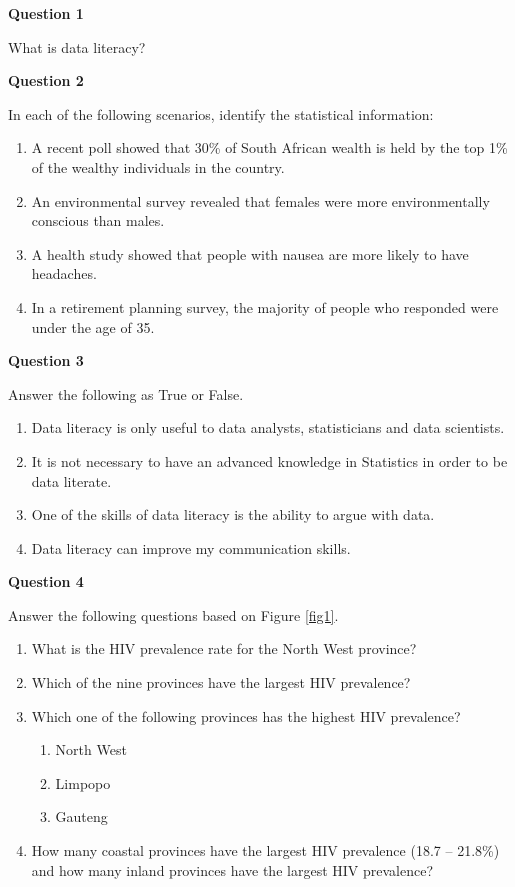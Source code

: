 \documentclass[
]{book}
\begin{document}
\textbf{Question 1}

What is data literacy?

\textbf{Question 2}

In each of the following scenarios, identify the statistical information:

\begin{enumerate}
\def\labelenumi{\alph{enumi}.}
\item
  A recent poll showed that 30\% of South African wealth is held by the top 1\% of the wealthy individuals in the country.
\item
  An environmental survey revealed that females were more environmentally conscious than males.
\item
  A health study showed that people with nausea are more likely to have headaches.
\item
  In a retirement planning survey, the majority of people who responded were under the age of 35.
\end{enumerate}

\textbf{Question 3}

Answer the following as True or False.

\begin{enumerate}
\def\labelenumi{\alph{enumi}.}
\item
  Data literacy is only useful to data analysts, statisticians and data scientists.
\item
  It is not necessary to have an advanced knowledge in Statistics in order to be data literate.
\item
  One of the skills of data literacy is the ability to argue with data.
\item
  Data literacy can improve my communication skills.
\end{enumerate}

\textbf{Question 4}

Answer the following questions based on Figure \ref{fig1}.

\begin{enumerate}
\def\labelenumi{\alph{enumi}.}
\item
  What is the HIV prevalence rate for the North West province?
\item
  Which of the nine provinces have the largest HIV prevalence?
\item
  Which one of the following provinces has the highest HIV prevalence?

  \begin{enumerate}
  \def\labelenumii{\roman{enumii}.}
  \item
    North West
  \item
    Limpopo
  \item
    Gauteng
  \end{enumerate}
\item
  How many coastal provinces have the largest HIV prevalence (18.7 -- 21.8\%) and how many inland provinces have the largest HIV prevalence?
\end{enumerate}
\end{document}
